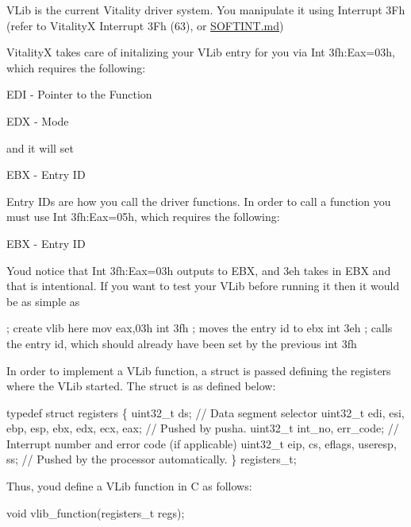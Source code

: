 V\+Lib is the current Vitality driver system. You manipulate it using Interrupt 3\+Fh (refer to VitalityX Interrupt 3\+Fh (63), or \hyperlink{a00008}{S\+O\+F\+T\+I\+N\+T.\+md})

VitalityX takes care of initalizing your V\+Lib entry for you via Int 3fh\+:Eax=03h, which requires the following\+:


\begin{DoxyItemize}
\item E\+DI -\/ Pointer to the Function
\item E\+DX -\/ Mode
\end{DoxyItemize}

and it will set


\begin{DoxyItemize}
\item E\+BX -\/ Entry ID
\end{DoxyItemize}

Entry ID\textquotesingle{}s are how you call the driver functions. In order to call a function you must use Int 3fh\+:Eax=05h, which requires the following\+:


\begin{DoxyItemize}
\item E\+BX -\/ Entry ID
\end{DoxyItemize}

You\textquotesingle{}d notice that Int 3fh\+:Eax=03h outputs to E\+BX, and 3eh takes in E\+BX and that is intentional. If you want to test your V\+Lib before running it then it would be as simple as 
\begin{DoxyCode}
; create vlib here
mov eax,03h
int 3fh ; moves the entry id to ebx
int 3eh ; calls the entry id, which should already have been set by the previous int 3fh
\end{DoxyCode}


In order to implement a V\+Lib function, a struct is passed defining the registers where the V\+Lib started. The struct is as defined below\+:


\begin{DoxyCode}
typedef struct registers
\{
   uint32\_t ds;                  // Data segment selector
   uint32\_t edi, esi, ebp, esp, ebx, edx, ecx, eax; // Pushed by pusha.
   uint32\_t int\_no, err\_code;    // Interrupt number and error code (if applicable)
   uint32\_t eip, cs, eflags, useresp, ss; // Pushed by the processor automatically.
\} registers\_t;
\end{DoxyCode}


Thus, youd define a V\+Lib function in C as follows\+: 
\begin{DoxyCode}
void vlib\_function(registers\_t regs);
\end{DoxyCode}



